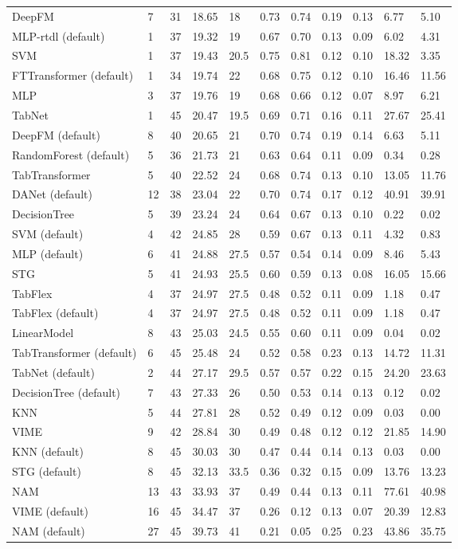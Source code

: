 \begin{tabular}{lllllllllll}
DeepFM & 7 & 31 & 18.65 & 18 & 0.73 & 0.74 & 0.19 & 0.13 & 6.77 & 5.10 \\
MLP-rtdl (default) & 1 & 37 & 19.32 & 19 & 0.67 & 0.70 & 0.13 & 0.09 & 6.02 & 4.31 \\
SVM & 1 & 37 & 19.43 & 20.5 & 0.75 & 0.81 & 0.12 & 0.10 & 18.32 & 3.35 \\
FTTransformer (default) & 1 & 34 & 19.74 & 22 & 0.68 & 0.75 & 0.12 & 0.10 & 16.46 & 11.56 \\
MLP & 3 & 37 & 19.76 & 19 & 0.68 & 0.66 & 0.12 & 0.07 & 8.97 & 6.21 \\
TabNet & 1 & 45 & 20.47 & 19.5 & 0.69 & 0.71 & 0.16 & 0.11 & 27.67 & 25.41 \\
DeepFM (default) & 8 & 40 & 20.65 & 21 & 0.70 & 0.74 & 0.19 & 0.14 & 6.63 & 5.11 \\
RandomForest (default) & 5 & 36 & 21.73 & 21 & 0.63 & 0.64 & 0.11 & 0.09 & 0.34 & 0.28 \\
TabTransformer & 5 & 40 & 22.52 & 24 & 0.68 & 0.74 & 0.13 & 0.10 & 13.05 & 11.76 \\
DANet (default) & 12 & 38 & 23.04 & 22 & 0.70 & 0.74 & 0.17 & 0.12 & 40.91 & 39.91 \\
DecisionTree & 5 & 39 & 23.24 & 24 & 0.64 & 0.67 & 0.13 & 0.10 & 0.22 & 0.02 \\
SVM (default) & 4 & 42 & 24.85 & 28 & 0.59 & 0.67 & 0.13 & 0.11 & 4.32 & 0.83 \\
MLP (default) & 6 & 41 & 24.88 & 27.5 & 0.57 & 0.54 & 0.14 & 0.09 & 8.46 & 5.43 \\
STG & 5 & 41 & 24.93 & 25.5 & 0.60 & 0.59 & 0.13 & 0.08 & 16.05 & 15.66 \\
TabFlex & 4 & 37 & 24.97 & 27.5 & 0.48 & 0.52 & 0.11 & 0.09 & 1.18 & 0.47 \\
TabFlex (default) & 4 & 37 & 24.97 & 27.5 & 0.48 & 0.52 & 0.11 & 0.09 & 1.18 & 0.47 \\
LinearModel & 8 & 43 & 25.03 & 24.5 & 0.55 & 0.60 & 0.11 & 0.09 & 0.04 & 0.02 \\
TabTransformer (default) & 6 & 45 & 25.48 & 24 & 0.52 & 0.58 & 0.23 & 0.13 & 14.72 & 11.31 \\
TabNet (default) & 2 & 44 & 27.17 & 29.5 & 0.57 & 0.57 & 0.22 & 0.15 & 24.20 & 23.63 \\
DecisionTree (default) & 7 & 43 & 27.33 & 26 & 0.50 & 0.53 & 0.14 & 0.13 & 0.12 & 0.02 \\
KNN & 5 & 44 & 27.81 & 28 & 0.52 & 0.49 & 0.12 & 0.09 & 0.03 & 0.00 \\
VIME & 9 & 42 & 28.84 & 30 & 0.49 & 0.48 & 0.12 & 0.12 & 21.85 & 14.90 \\
KNN (default) & 8 & 45 & 30.03 & 30 & 0.47 & 0.44 & 0.14 & 0.13 & 0.03 & 0.00 \\
STG (default) & 8 & 45 & 32.13 & 33.5 & 0.36 & 0.32 & 0.15 & 0.09 & 13.76 & 13.23 \\
NAM & 13 & 43 & 33.93 & 37 & 0.49 & 0.44 & 0.13 & 0.11 & 77.61 & 40.98 \\
VIME (default) & 16 & 45 & 34.47 & 37 & 0.26 & 0.12 & 0.13 & 0.07 & 20.39 & 12.83 \\
NAM (default) & 27 & 45 & 39.73 & 41 & 0.21 & 0.05 & 0.25 & 0.23 & 43.86 & 35.75 \\
\bottomrule
\end{tabular}
